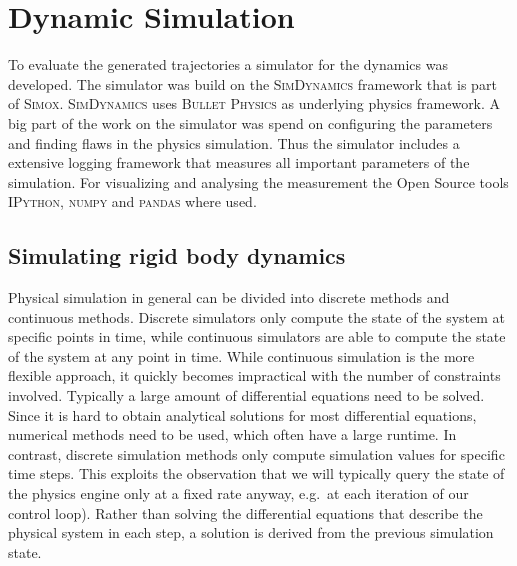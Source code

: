 \documentclass[english,ngerman]{KITreprt}
\newcommand{\name}[1]{\textsc{#1}}
\begin{document}
\chapter{Dynamic Simulation}\label{dynamic-simulation}

To evaluate the generated trajectories a simulator for the dynamics was
developed. The simulator was build on the \name{SimDynamics} framework
that is part of \name{Simox}. \name{SimDynamics} uses
\name{Bullet Physics} as underlying physics framework. A big part of the
work on the simulator was spend on configuring the parameters and
finding flaws in the physics simulation. Thus the simulator includes a
extensive logging framework that measures all important parameters of
the simulation. For visualizing and analysing the measurement the Open
Source tools \name{IPython}, \name{numpy} and \name{pandas} where used.

\section{Simulating rigid body
dynamics}\label{section:rigid-body-simulation}

Physical simulation in general can be divided into discrete methods and
continuous methods. Discrete simulators only compute the state of the
system at specific points in time, while continuous simulators are able
to compute the state of the system at any point in time. While
continuous simulation is the more flexible approach, it quickly becomes
impractical with the number of constraints involved. Typically a large
amount of differential equations need to be solved. Since it is hard to
obtain analytical solutions for most differential equations, numerical
methods need to be used, which often have a large runtime. In contrast,
discrete simulation methods only compute simulation values for specific
time steps. This exploits the observation that we will typically query
the state of the physics engine only at a fixed rate anyway, e.g.~at
each iteration of our control loop). Rather than solving the
differential equations that describe the physical system in each step, a
solution is derived from the previous simulation state.
\end{document}
